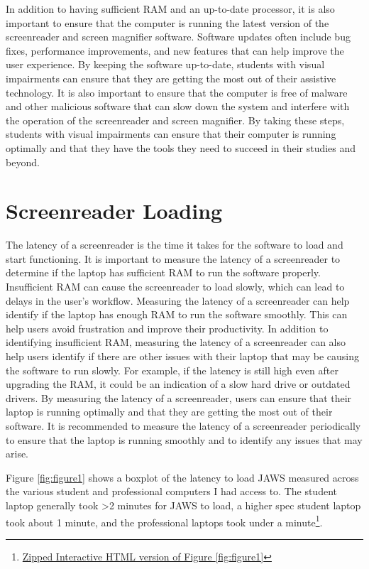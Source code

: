 In addition to having sufficient RAM and an up-to-date processor, it is also important to ensure that the computer is running the latest version of the screenreader and screen magnifier software. Software updates often include bug fixes, performance improvements, and new features that can help improve the user experience. By keeping the software up-to-date, students with visual impairments can ensure that they are getting the most out of their assistive technology. It is also important to ensure that the computer is free of malware and other malicious software that can slow down the system and interfere with the operation of the screenreader and screen magnifier. By taking these steps, students with visual impairments can ensure that their computer is running optimally and that they have the tools they need to succeed in their studies and beyond.

\pagebreak \hypertarget{screenreader-loading}{}\section{Screenreader Loading}\label{screenreader-loading}
The latency of a screenreader is the time it takes for the software to load and start functioning. It is important to measure the latency of a screenreader to determine if the laptop has sufficient RAM to run the software properly. Insufficient RAM can cause the screenreader to load slowly, which can lead to delays in the user’s workflow. Measuring the latency of a screenreader can help identify if the laptop has enough RAM to run the software smoothly. This can help users avoid frustration and improve their productivity. In addition to identifying insufficient RAM, measuring the latency of a screenreader can also help users identify if there are other issues with their laptop that may be causing the software to run slowly. For example, if the latency is still high even after upgrading the RAM, it could be an indication of a slow hard drive or outdated drivers. By measuring the latency of a screenreader, users can ensure that their laptop is running optimally and that they are getting the most out of their software. It is recommended to measure the latency of a screenreader periodically to ensure that the laptop is running smoothly and to identify any issues that may arise.

Figure \ref{fig:figure1} shows a boxplot of the latency to load JAWS measured across the various student and professional computers I had access to. The student laptop generally took \textgreater2 minutes for JAWS to load, a higher spec student laptop took about 1 minute, and the professional laptops took under a minute\footnote{\raggedright \href{http://github.com/mrhunsaker/MiscResources/raw/main/ComputerRBDisplaySpecsTVIFig1.zip}{Zipped Interactive HTML version of Figure \ref{fig:figure1}}}.

